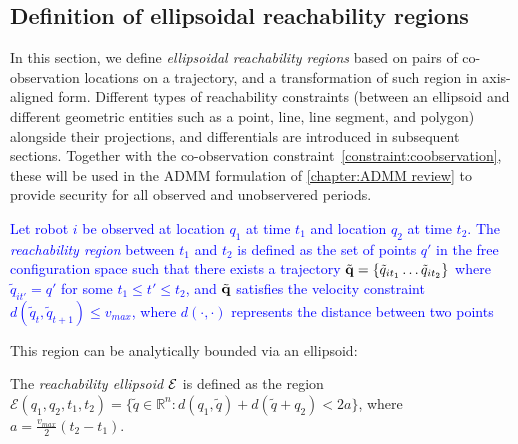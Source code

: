 \documentclass[10pt,twocolumn,twoside]{IEEEtran}
\newcommand{\new}[1]{\textcolor{blue}{#1}}
\begin{document}
\subsection{Definition of ellipsoidal reachability regions}\label{sec:reachability}
In this section, we define \emph{ellipsoidal reachability regions} based on pairs of co-observation locations on a trajectory, and a transformation of such region in axis-aligned form. Different types of reachability constraints (between an ellipsoid and different geometric entities such as a point, line, line segment, and polygon) alongside their projections, and differentials are introduced in subsequent sections. Together with the co-observation constraint~\ref{constraint:coobservation}, these will be used in the ADMM formulation of \cref{chapter:ADMM review} to provide security for all observed and unobservered periods.


\begin{definition}\label{sec:ellipsoidal definition}
  \new{Let robot $i$ be observed at location $q_{1}$ at time $t_1$ and location $q_{2}$ at time $t_2$. The \emph{reachability region} between $t_1$ and $t_2$ is defined as the set of points $q'$ in the free configuration space such that there exists a trajectory $\tilde{\mathbf{q}} = \{\tilde{q}_{it_1}\dots \tilde{q}_{it_2}\}$ where $\tilde{q}_{it'} = q'$ for some $t_1 \leq t' \leq t_2$, and $\tilde{\mathbf{q}}$ satisfies the velocity constraint $d(\tilde q_t,\tilde q_{t+1})\leq v_{max}$, where $d(\cdot,\cdot)$ represents the distance between two points}
\end{definition}
This region can be analytically bounded via an ellipsoid:
\begin{definition}\label{def:Reachability}
	The \emph{reachability ellipsoid $\mathcal{E}$} is defined as the region  $\mathcal{E}(q_1,q_2,t_{1},t_{2})=\{\tilde{q}\in\mathbb{R}^n: d(q_1,\tilde{q})+d(\tilde{q}+q_2)<2a\}$, where $a=\frac{v_{max}}{2}(t_2-t_1)$.
\end{definition}
\end{document}
